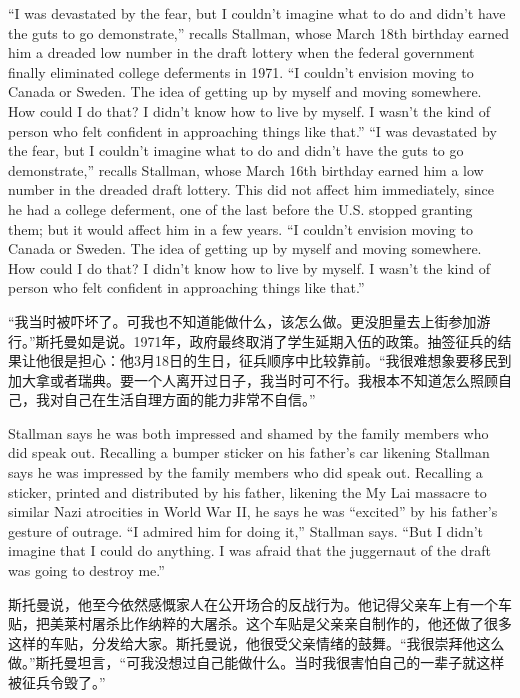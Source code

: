 \ifdefined\eng
\ifdefined\vone
``I was devastated by the fear, but I couldn't imagine what to do and didn't have the guts to go demonstrate,'' recalls Stallman, whose March 18th birthday earned him a dreaded low number in the draft lottery when the federal government finally eliminated college deferments in 1971. ``I couldn't envision moving to Canada or Sweden. The idea of getting up by myself and moving somewhere. How could I do that? I didn't know how to live by myself. I wasn't the kind of person who felt confident in approaching things like that.''
\fi
\ifdefined\vtwo
``I was devastated by the fear, but I couldn't imagine what to do and didn't have the guts to go demonstrate,'' recalls Stallman, whose March 16th birthday earned him a low number in the dreaded draft lottery.  This did not affect him immediately, since he had a college deferment, one of the last before the U.S. stopped granting them; but it would affect him in a few years. ``I couldn't envision moving to Canada or Sweden. The idea of getting up by myself and moving somewhere. How could I do that? I didn't know how to live by myself. I wasn't the kind of person who felt confident in approaching things like that.''
\fi
\fi

\ifdefined\chs
``我当时被吓坏了。可我也不知道能做什么，该怎么做。更没胆量去上街参加游行。''斯托曼如是说。1971年，政府最终取消了学生延期入伍的政策。抽签征兵的结果让他很是担心：他3月18日的生日，征兵顺序中比较靠前。``我很难想象要移民到加大拿或者瑞典。要一个人离开过日子，我当时可不行。我根本不知道怎么照顾自己，我对自己在生活自理方面的能力非常不自信。''
\fi

\ifdefined\eng
\ifdefined\vone Stallman says he was both impressed and shamed by the family members who did speak out. Recalling a bumper sticker on his father's car likening \fi\ifdefined\vtwo Stallman says he was impressed by the family members who did speak out. Recalling a sticker, printed and distributed by his father, likening \fi the My Lai massacre to similar Nazi atrocities in World War II, he says he was ``excited'' by his father's gesture of outrage. ``I admired him for doing it,'' Stallman says. ``But I didn't imagine that I could do anything. I was afraid that the juggernaut of the draft was going to destroy me.''
\fi

\ifdefined\chs
斯托曼说，他至今依然感慨家人在公开场合的反战行为。他记得父亲车上有一个车贴，把美莱村屠杀比作纳粹的大屠杀。这个车贴是父亲亲自制作的，他还做了很多这样的车贴，分发给大家。斯托曼说，他很受父亲情绪的鼓舞。``我很崇拜他这么做。''斯托曼坦言，``可我没想过自己能做什么。当时我很害怕自己的一辈子就这样被征兵令毁了。''
\fi

